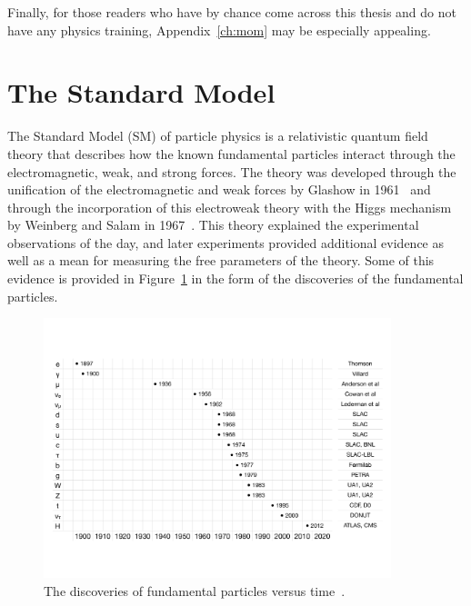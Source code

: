 Finally, for those readers who have by chance come across this thesis and do not
have any physics training, Appendix~\ref{ch:mom} may be especially appealing.

\section{The Standard Model\label{sec:SM}}

The Standard Model (SM) of particle physics is a relativistic quantum field theory
that describes how the known fundamental particles interact through the electromagnetic, weak,
and strong forces.
The theory was developed through the unification of the electromagnetic and weak forces by Glashow
in 1961~\cite{1961.Glashow.Partial-symmetries} and through the incorporation of this electroweak
theory with the Higgs mechanism by Weinberg and Salam in 1967~\cite{PhysRevLett.19.1264,Salam:1968rm}.
This theory explained the experimental observations of the day, and later experiments provided
additional evidence as well as a mean for measuring the free parameters of the theory. Some of
this evidence is provided in Figure~\ref{fig:discoveries} in the form of the discoveries of
the fundamental particles.

\begin{figure}[ht]
 \begin{center}
    \includegraphics[width=0.90\textwidth]{figures/intro/discoveries.pdf}
      \end{center}
\caption{The discoveries of fundamental particles versus time~\cite{Tuna:thesis}.}
\label{fig:discoveries}
\end{figure}

